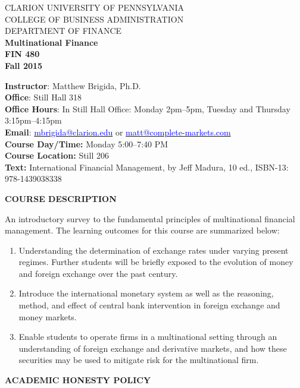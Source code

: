 \documentclass{article}
\begin{document}
\begin{center}
CLARION UNIVERSITY OF PENNSYLVANIA\\
COLLEGE OF BUSINESS ADMINISTRATION\\
DEPARTMENT OF FINANCE
\\
{\bf Multinational Finance}\\
{\bf FIN 480}\\
{\bf Fall 2015}\\
\end{center}
\vspace*{6pt}
{\bf Instructor}: Matthew Brigida, Ph.D.\\
{\bf Office}: Still Hall 318\\
{\bf Office Hours}:  In Still Hall Office:  Monday 2pm--5pm, Tuesday and Thursday 3:15pm--4:15pm\\
{\bf Email}: \href{mailto:mbrigida@clarion.edu}{\textcolor{blue}{mbrigida@clarion.edu}} or \href{mailto:matt@complete-markets.com}{\textcolor{blue}{matt@complete-markets.com}} \\
{\bf Course Day/Time:} Monday 5:00--7:40 PM \\
{\bf Course Location:} Still 206 \\
{\bf Text:} International Financial Management, by Jeff Madura, 10 ed., ISBN-13: 978-1439038338 \\
\begin{center}
{\bf COURSE DESCRIPTION}
\end{center}  
An introductory survey to the fundamental principles of multinational financial management. The learning outcomes for this course are summarized below:
\begin{enumerate}
\item Understanding the determination of exchange rates under varying present regimes.  Further students will be briefly exposed to the evolution of money and foreign exchange over the past century.       
\item Introduce the international monetary system as well as the reasoning, method, and effect of central bank intervention in foreign exchange and money markets.
\item Enable students to operate firms in a multinational setting through an understanding of foreign exchange and derivative markets, and how these securities may be used to mitigate risk for the multinational firm.
\end{enumerate}
\begin{center}
{\bf ACADEMIC HONESTY POLICY}
\end{center} 
\end{document}
